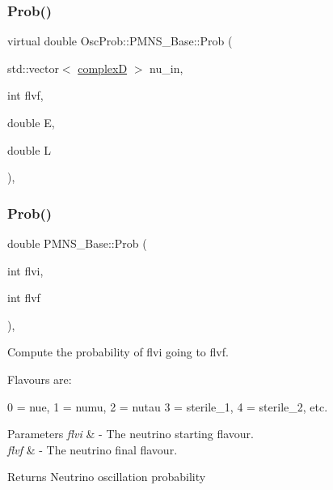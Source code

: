 \subsubsection{\texorpdfstring{Prob()}{Prob()}\hspace{0.1cm}{\footnotesize\ttfamily [3/6]}}
{\footnotesize\ttfamily virtual double Osc\+Prob\+::\+P\+M\+N\+S\+\_\+\+Base\+::\+Prob (\begin{DoxyParamCaption}\item[{std\+::vector$<$ \hyperlink{EigenPoint_8h_a67ca8e107e20610c3fff78d5e726ece0}{complexD} $>$}]{nu\+\_\+in,  }\item[{int}]{flvf,  }\item[{double}]{E,  }\item[{double}]{L }\end{DoxyParamCaption})\hspace{0.3cm}{\ttfamily [virtual]}, {\ttfamily [inherited]}}

\mbox{\label{classOscProb_1_1PMNS__Base_aec5c399b93261f1962a4b7dbbb44b973}} 
\subsubsection{\texorpdfstring{Prob()}{Prob()}\hspace{0.1cm}{\footnotesize\ttfamily [4/6]}}
{\footnotesize\ttfamily double P\+M\+N\+S\+\_\+\+Base\+::\+Prob (\begin{DoxyParamCaption}\item[{int}]{flvi,  }\item[{int}]{flvf }\end{DoxyParamCaption})\hspace{0.3cm}{\ttfamily [virtual]}, {\ttfamily [inherited]}}

Compute the probability of flvi going to flvf.

Flavours are\+: 
\begin{DoxyPre}
  0 = nue, 1 = numu, 2 = nutau
  3 = sterile\_1, 4 = sterile\_2, etc.
\end{DoxyPre}
 
\begin{DoxyParams}{Parameters}
{\em flvi} & -\/ The neutrino starting flavour. \\
\hline
{\em flvf} & -\/ The neutrino final flavour.\\
\hline
\end{DoxyParams}
\begin{DoxyReturn}{Returns}
Neutrino oscillation probability 
\end{DoxyReturn}


